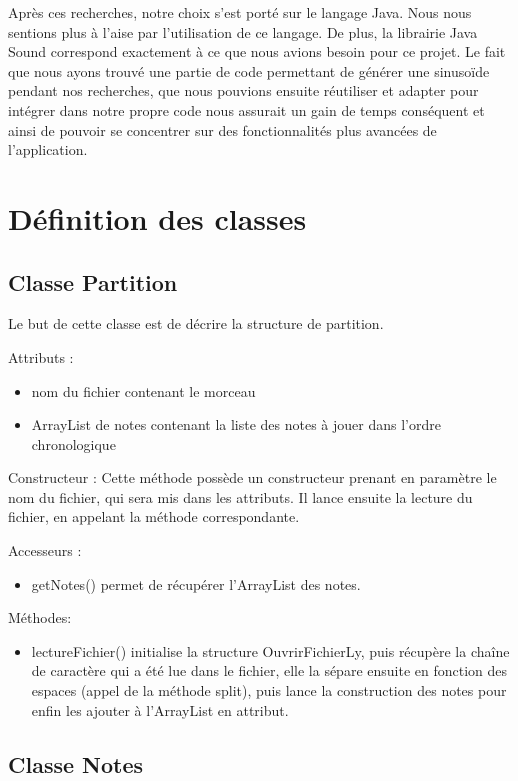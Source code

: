\documentclass{EPUProjetPeiP}
\begin{document}
Après ces recherches, notre choix s'est porté sur le langage Java. Nous nous sentions plus à l'aise par l'utilisation de ce langage. De plus, la librairie Java Sound correspond exactement à ce que nous avions besoin pour ce projet. Le fait que nous ayons trouvé une partie de code permettant de générer une sinusoïde pendant nos recherches, que nous pouvions ensuite réutiliser et adapter pour intégrer dans notre propre code nous assurait un gain de temps conséquent et ainsi de pouvoir se concentrer sur des fonctionnalités plus avancées de l'application.


\section{Définition des classes}

\subsection{Classe Partition}

Le but de cette classe est de décrire la structure de partition.

Attributs :
\begin{itemize}
\item nom du fichier contenant le morceau
\item ArrayList de notes contenant la liste des notes à jouer dans l'ordre chronologique
\end{itemize}

Constructeur :
Cette méthode possède un constructeur prenant en paramètre le nom du fichier, qui sera mis dans les attributs.
Il lance ensuite la lecture du fichier, en appelant la méthode correspondante.

Accesseurs :
\begin{itemize}
\item getNotes() permet de récupérer l'ArrayList des notes.
\end{itemize}


Méthodes:
\begin{itemize}
\item lectureFichier() initialise la structure OuvrirFichierLy, puis récupère la chaîne de caractère qui a été lue dans le fichier, elle la sépare ensuite en fonction des espaces (appel de la méthode split), puis lance la construction des notes pour enfin les ajouter à l'ArrayList en attribut.
\end{itemize}

\subsection{Classe Notes}
\end{document}
